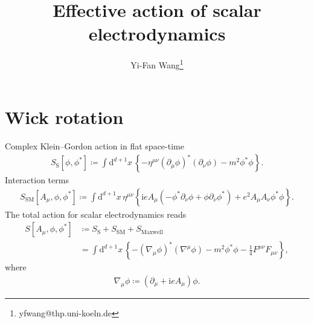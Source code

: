 \documentclass[12pt]{article}
\newcommand\mi{\mathrm{i}} %
\newcommand\dif{\mathrm{d}}
\newcommand{\rbr}[1]{{\left(#1\right)}}
\newcommand{\cbr}[1]{{\left\{#1\right\}}}
\newcommand{\sfun}[2]{{#1}\mathopen{}\left[#2\right]\mathclose{}}
\begin{document}
\title{Effective action of scalar electrodynamics} 


\date{}


\author[3]{Yi-Fan Wang\thanks{yfwang@thp.uni-koeln.de}}





\maketitle

%


\section{Wick rotation}


Complex Klein--Gordon action in flat space-time
\begin{align}
\sfun{S_\text{S}}{\phi,\phi^*}\coloneqq\int\dif^{d+1}x\,\cbr{-\eta^{\mu\nu}
\rbr{\partial_\mu\phi}^* \rbr{\partial_\nu\phi} - m^2\phi^*\phi}.
\end{align}
Interaction terms
\begin{align}
\sfun{S_\text{SM}}{A_\mu,\phi,\phi^*} \coloneqq \int\dif^{d+1}x\,
\eta^{\mu\nu}{}
\cbr{\mi e A_\mu \rbr{-\phi^*\partial_\nu\phi+\phi\partial_\nu\phi^*}
+e^2 A_\mu A_\nu \phi^* \phi}.
\end{align}
The total action for scalar electrodynamics reads
\begin{align}
\sfun{S}{A_\mu, \phi, \phi^*} &\coloneqq 
S_\text{S} + S_\text{SM} + S_\text{Maxwell} \nonumber \\
&= \int\dif^{d+1}x\,\cbr{-\rbr{\nabla_{\!\mu} \phi}^* \rbr{\nabla^\mu\phi} - 
m^2\phi^*\phi -\frac{1}{4}F^{\mu\nu}F_{\mu\nu}},
\end{align}
where
\begin{align}
\nabla_\mu\phi \coloneqq \rbr{\partial_\mu+\mi e A_\mu}\phi.
\end{align}
\end{document}
